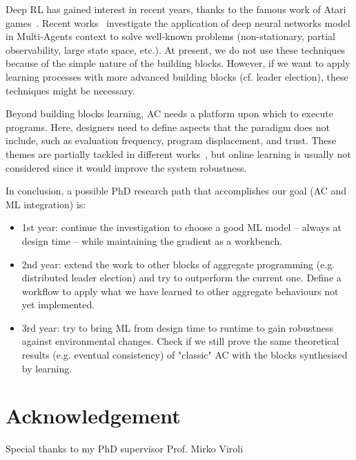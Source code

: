 \documentclass[conference]{IEEEtran}
\begin{document}
Deep RL has gained interest in recent years, thanks to the famous work of Atari games~\cite{DBLP:journals/corr/HosuR16}. 
%
Recent works~\cite{DBLP:journals/aamas/Hernandez-LealK19} investigate the application of deep neural networks model in Multi-Agents context to solve well-known problems (non-stationary, partial observability, large state space, etc.). 
%
At present, we do not use these techniques because of the simple nature of the building blocks. However, if we want to apply learning processes with more advanced building blocks (cf. leader election), these techniques might be necessary.

Beyond building blocks learning, AC needs a platform upon which to execute programs. 
%
Here, designers need to define aspects that the paradigm does not include, such as evaluation frequency, program displacement, and trust.
% 
These themes are partially tackled in different works~\cite{DBLP:journals/scp/CasadeiAV18, DBLP:journals/fi/CasadeiPPVW20, DBLP:journals/corr/abs-2012-13806}, but online learning is usually not considered since it would improve the system robustness.

%
%
In conclusion, a possible PhD research path that accomplishes our goal (AC and ML integration) is:
\begin{itemize}
    \item 1st year: continue the investigation to choose a good ML model -- always at design time -- while maintaining the gradient as a workbench.
    \item 2nd year: extend the work to other blocks of aggregate programming (e.g. distributed leader election) and try to outperform the current one. Define a workflow to apply what we have learned to other aggregate behaviours not yet implemented.
    \item 3rd year: try to bring ML from design time to runtime to gain robustness against environmental changes. Check if we still prove the same theoretical results (e.g. eventual consistency) of "classic" AC with the blocks synthesised by learning.
\end{itemize}
\section*{Acknowledgement}
Special thanks to my PhD supervisor Prof. Mirko Viroli


\end{document}
